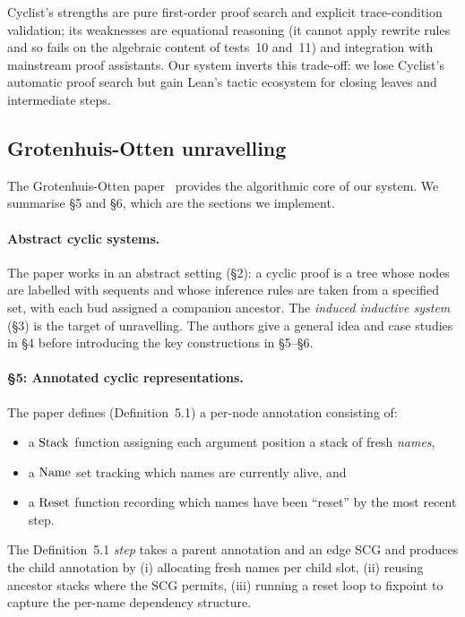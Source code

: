 Cyclist's strengths are pure first-order proof search and explicit
trace-condition validation; its weaknesses are equational reasoning (it
cannot apply rewrite rules and so fails on the algebraic content of tests~10
and~11) and integration with mainstream proof
assistants. Our system inverts this trade-off: we lose Cyclist's automatic
proof search but gain Lean's tactic ecosystem for closing leaves and
intermediate steps.

\subsection{Grotenhuis-Otten unravelling}
\label{sec:bg-grotenhuis}

The Grotenhuis-Otten paper~\cite{grotenhuis2026unravelling} provides the
algorithmic core of our system. We summarise §5 and §6, which are the
sections we implement.

\paragraph{Abstract cyclic systems.}
The paper works in an abstract setting (§2): a cyclic proof is a tree whose
nodes are labelled with sequents and whose inference rules are taken from a
specified set, with each bud assigned a companion ancestor. The
\emph{induced inductive system} (§3) is the target of unravelling. The
authors give a general idea and case studies in §4 before introducing the
key constructions in §5--§6.

\paragraph{§5: Annotated cyclic representations.}
The paper defines (Definition~5.1) a per-node annotation consisting of:
\begin{itemize}
  \item a \(\mathrm{Stack}\) function assigning each argument position a stack of
    fresh \emph{names},
  \item a \(\mathrm{Name}\) set tracking which names are currently alive, and
  \item a \(\mathrm{Reset}\) function recording which names have been ``reset'' by
    the most recent step.
\end{itemize}
The Definition~5.1 \emph{step} takes a parent annotation and an edge SCG and
produces the child annotation by (i) allocating fresh names per child slot,
(ii) reusing ancestor stacks where the SCG permits, (iii) running a reset
loop to fixpoint to capture the per-name dependency structure.

